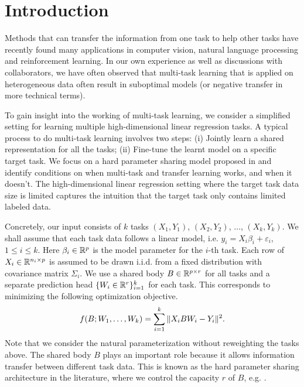 \section{Introduction}

Methods that can transfer the information from one task to help other tasks have recently found many applications in computer vision, natural language processing and reinforcement learning.
In our own experience as well as discussions with collaborators, we have often observed that multi-task learning that is applied on heterogeneous data often result in suboptimal models (or negative transfer in more technical terms).

To gain insight into the working of multi-task learning, we consider a simplified setting for learning multiple high-dimensional linear regression tasks.
A typical process to do multi-task learning involves two steps:
(i) Jointly learn a shared representation for all the tasks;
(ii) Fine-tune the learnt model on a specific target task.
We focus on a hard parameter sharing model proposed in \cite{WZR20} and identify conditions on when multi-task and transfer learning works, and when it doesn't.
The high-dimensional linear regression setting where the target task data size is limited captures the intuition that the target task only contains limited labeled data.

Concretely, our input consists of $k$ tasks $(X_1, Y_1)$, $(X_2, Y_2)$, $\dots$, $(X_k, Y_k)$.
We shall assume that each task data follows a linear model, i.e. $y_i = X_i \beta_i + \varepsilon_i$, $1\le i\le k$.
Here $\beta_i\in\mathbb{R}^p$ is the model parameter for the $i$-th task.
Each row of $X_i\in\mathbb{R}^{n_i\times p}$ is assumed to be drawn i.i.d. from a fixed distribution with covariance matrix $\Sigma_i$.
We use a shared body $B\in\mathbb{R}^{p\times r}$ for all tasks and a separate prediction head $\{W_i \in \mathbb{R}^{r}\}_{i=1}^k$ for each task.
This corresponds to minimizing the following optimization objective.
\begin{align}
	\label{eq_mtl}
	f(B; W_1, \dots, W_k) = \sum_{i=1}^k \|X_i B W_i - Y_i\|^2.
\end{align}
Note that we consider the natural parameterization without reweighting the tasks above.
The shared body $B$ plays an important role because it allows information transfer between different task data.
This is known as the hard parameter sharing architecture in the literature, where we control the capacity $r$ of $B$, e.g. \cite{KD12,WZR20}.

